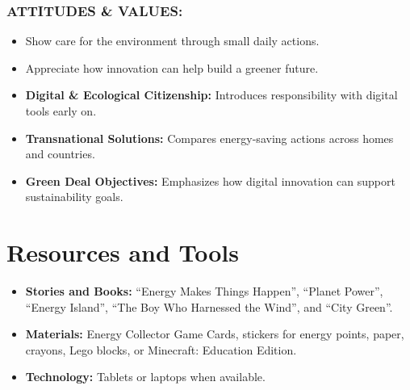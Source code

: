 \documentclass[11pt, a4paper]{article}
\begin{document}
\subsubsection*{ATTITUDES \& VALUES:}
\begin{itemize}
    \item Show care for the environment through small daily actions.
    \item Appreciate how innovation can help build a greener future.
\end{itemize}

\begin{eurobox}
\begin{itemize}
    \item \textbf{Digital \& Ecological Citizenship:} Introduces responsibility with digital tools early on.
    \item \textbf{Transnational Solutions:} Compares energy-saving actions across homes and countries.
    \item \textbf{Green Deal Objectives:} Emphasizes how digital innovation can support sustainability goals.
\end{itemize}
\end{eurobox}

\newpage
\section{Resources and Tools}
\begin{itemize}
    \item \textbf{Stories and Books:} ``Energy Makes Things Happen'', ``Planet Power'', ``Energy Island'', ``The Boy Who Harnessed the Wind'', and ``City Green''.
    \item \textbf{Materials:} Energy Collector Game Cards, stickers for energy points, paper, crayons, Lego blocks, or Minecraft: Education Edition.
    \item \textbf{Technology:} Tablets or laptops when available.
\end{itemize}
\end{document}
